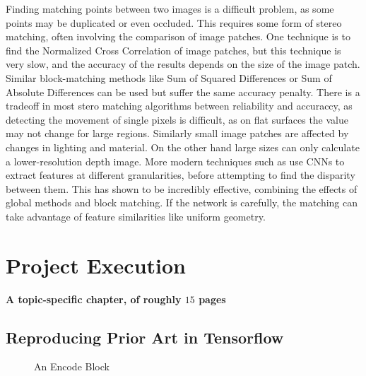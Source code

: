\documentclass[ %
                    author={Gavin Parker},
                supervisor={Dr. Neill Campbell},
                    degree={MEng},
                     title={Deep Siamese Networks for Illumination Estimation from Stereo Images},
                  subtitle={},
                      type={research},
                      year={2018} ]{dissertation}
\begin{document}
Finding matching points between two images is a difficult problem, as some points may be duplicated or even occluded. This requires some form of stereo matching, often involving the comparison of image patches. One technique is to find the Normalized Cross Correlation of image patches, but this technique is very slow, and the accuracy of the results depends on the size of the image patch. Similar block-matching methods like Sum of Squared Differences or Sum of Absolute Differences can be used but suffer the same accuracy penalty. There is a tradeoff in most stero matching algorithms between reliability and accuraccy, as detecting the movement of single pixels is difficult, as on flat surfaces the value may not change for large regions. Similarly small image patches are affected by changes in lighting and material. On the other hand large sizes can only calculate a lower-resolution depth image.  More modern techniques such as \cite{7780983} use CNNs to extract features at different granularities, before attempting to find the disparity between them. This has shown to be incredibly effective, combining the effects of global methods and block matching. If the network is carefully, the matching can take advantage of feature similarities like uniform geometry.

\chapter{Project Execution}
\label{chap:execution}

{\bf A topic-specific chapter, of roughly $15$ pages} 
\vspace{1cm} 

\section{Reproducing Prior Art in Tensorflow}
\begin{figure}
\centering
{}

\caption{An Encode Block}
\label{encode}
\end{figure}
\end{document}
